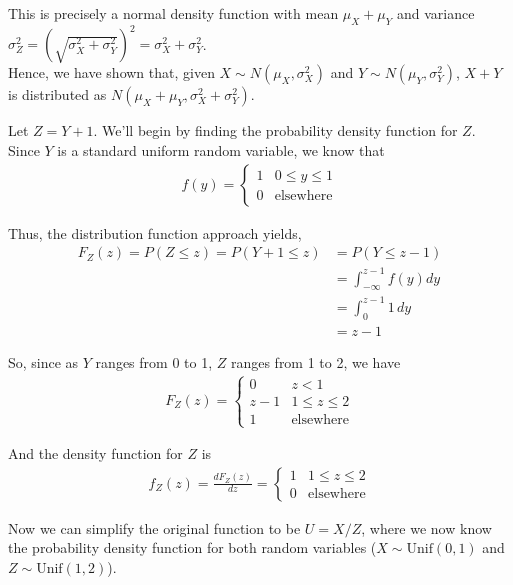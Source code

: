 \documentclass[12pt]{article}
\newenvironment{problem}[2][Problem]{\begin{trivlist}
\item[\hskip \labelsep {\bfseries #1}\hskip \labelsep {\bfseries #2.}]}{\end{trivlist}}
\begin{document}
This is precisely a normal density function with mean $\mu_X + \mu_Y$ and variance $\sigma_Z^2 = (\sqrt{\sigma_X^2 + \sigma_Y^2})^2 = \sigma_X^2 + \sigma_Y^2$.\\

Hence, we have shown that, given $X \sim N(\mu_X, \sigma_X^2)$ and $Y \sim N(\mu_Y, \sigma_Y^2)$, $X + Y$ is distributed as $N(\mu_X + \mu_Y, \sigma_X^2 + \sigma_Y^2)$.

\begin{problem}{2}
\end{problem}

Let $Z = Y + 1$. We'll begin by finding the probability density function for $Z$. Since $Y$ is a standard uniform random variable, we know that
\begin{align*}
f(y) = \begin{cases} 
      1 & 0 \leq y \leq 1 \\
      0 & \text{elsewhere} 
   \end{cases}
\end{align*}

Thus, the distribution function approach yields,
\begin{align*}
F_Z(z) = P(Z \leq z) = P(Y + 1 \leq z) &= P(Y \leq z - 1)\\
&= \int_{-\infty}^{z-1} f(y)dy \\
&= \int_0^{z-1} 1 \, dy\\
&= z-1
\end{align*}

So, since as $Y$ ranges from 0 to 1, $Z$ ranges from 1 to 2, we have
\begin{align*}
F_Z(z) = \begin{cases} 
      0 & z < 1 \\
      z-1 & 1 \leq z \leq 2\\
      1 & \text{elsewhere} 
   \end{cases}
\end{align*}

And the density function for $Z$ is
\begin{align*}
f_Z(z) = \frac{dF_Z(z)}{dz} = \begin{cases} 
      1 & 1 \leq z \leq 2\\
      0 & \text{elsewhere} 
   \end{cases}
\end{align*}

Now we can simplify the original function to be $U = X/Z$, where we now know the probability density function for both random variables ($X \sim \text{Unif}(0,1)$ and $Z \sim \text{Unif}(1, 2)$).\\
\end{document}
